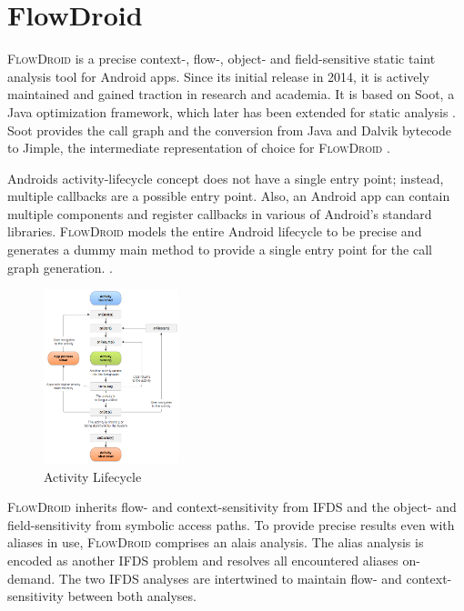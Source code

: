 \documentclass[../draft.tex]{subfiles}
\begin{document}
    \section{FlowDroid}\label{s:flowdroid}
    \textsc{FlowDroid} is a precise context-, flow-, object- and field-sensitive static taint analysis tool for Android apps\cite{Arzt2014}.
    Since its initial release in 2014, it is actively maintained and gained traction in research and academia\footnotemark{}.
    It is based on Soot, a Java optimization framework, which later has been extended for static analysis \cite{Lam2011}.
    Soot provides the call graph and the conversion from Java and Dalvik bytecode to Jimple, the intermediate representation of choice for \textsc{FlowDroid} \cite{Arzt2017PhD}.

    Androids activity-lifecycle concept does not have a single entry point; instead, multiple callbacks are a possible entry point.
    Also, an Android app can contain multiple components and register callbacks in various of Android's standard libraries.
    \textsc{FlowDroid} models the entire Android lifecycle to be precise and generates a dummy main method to provide a single entry point for the call graph generation.
    \cite{Arzt2014}.

    \begin{figure}[tbp]
        \centering
        \includegraphics[width=0.35\textwidth]{figs/activity_lifecycle.png}
        \caption{Activity Lifecycle\protect\footnotemark}
        \label{f:activity}
    \end{figure}

    \textsc{FlowDroid} inherits flow- and context-sensitivity from IFDS and the object- and field-sensitivity from symbolic access paths. To provide precise results even with aliases in use, \textsc{FlowDroid} comprises an alais analysis. The alias analysis is encoded as another IFDS problem and resolves all encountered aliases on-demand. The two IFDS analyses are intertwined to maintain flow- and context-sensitivity between both analyses\cite{Arzt2014}.
\end{document}
